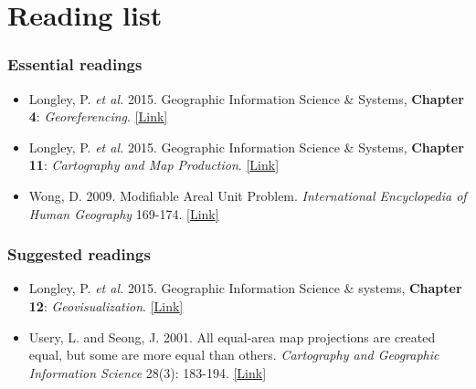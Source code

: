\documentclass[
]{book}
\providecommand{\tightlist}{%
  \setlength{\itemsep}{0pt}\setlength{\parskip}{0pt}}
\begin{document}
\hypertarget{reading-w03}{%
\section{Reading list}\label{reading-w03}}

\hypertarget{essential-readings-2}{%
\subsubsection*{Essential readings}\label{essential-readings-2}}

\begin{itemize}
\tightlist
\item
  Longley, P. \emph{et al.} 2015. Geographic Information Science \& Systems, \textbf{Chapter 4}: \emph{Georeferencing}. \href{https://ucl.rl.talis.com/link?url=https\%3A\%2F\%2Fapp.knovel.com\%2Fhotlink\%2Ftoc\%2Fid\%3AkpGISSE001\%2Fgeographic-information-science\%3Fkpromoter\%3Dmarc\&sig=e437927b963cc591dcb65491eccdd3869cc31aef80e1443cb2ba12d8f3bb031a}{{[}Link{]}}
\item
  Longley, P. \emph{et al.} 2015. Geographic Information Science \& Systems, \textbf{Chapter 11}: \emph{Cartography and Map Production}. \href{https://ucl.rl.talis.com/link?url=https\%3A\%2F\%2Fapp.knovel.com\%2Fhotlink\%2Ftoc\%2Fid\%3AkpGISSE001\%2Fgeographic-information-science\%3Fkpromoter\%3Dmarc\&sig=e437927b963cc591dcb65491eccdd3869cc31aef80e1443cb2ba12d8f3bb031a}{{[}Link{]}}
\item
  Wong, D. 2009. Modifiable Areal Unit Problem. \emph{International Encyclopedia of Human Geography} 169-174. \href{https://doi.org/10.1016/B978-008044910-4.00475-2}{{[}Link{]}}
\end{itemize}

\hypertarget{suggested-readings-2}{%
\subsubsection*{Suggested readings}\label{suggested-readings-2}}

\begin{itemize}
\tightlist
\item
  Longley, P. \emph{et al.} 2015. Geographic Information Science \& systems, \textbf{Chapter 12}: \emph{Geovisualization}. \href{https://ucl.rl.talis.com/link?url=https\%3A\%2F\%2Fapp.knovel.com\%2Fhotlink\%2Ftoc\%2Fid\%3AkpGISSE001\%2Fgeographic-information-science\%3Fkpromoter\%3Dmarc\&sig=e437927b963cc591dcb65491eccdd3869cc31aef80e1443cb2ba12d8f3bb031a}{{[}Link{]}}
\item
  Usery, L. and Seong, J. 2001. All equal-area map projections are created equal, but some are more equal than others. \emph{Cartography and Geographic Information Science} 28(3): 183-194. \href{https://doi.org/10.1559/152304001782153053}{{[}Link{]}}
\end{itemize}
\end{document}
